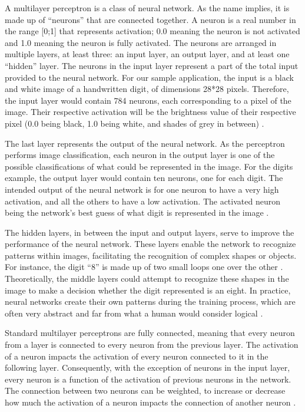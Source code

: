 ﻿\documentclass[12pt,a4paper,notitlepage]{article}
\begin{document}
A multilayer perceptron is a class of neural network. As the name implies, it is made up of “neurons” that are connected together. A neuron is a real number in the range [0;1] that represents activation; 0.0 meaning the neuron is not activated and 1.0 meaning the neuron is fully activated. The neurons are arranged in multiple layers, at least three: an input layer, an output layer, and at least one “hidden” layer. The neurons in the input layer represent a part of the total input provided to the neural network. For our sample application, the input is a black and white image of a handwritten digit, of dimensions 28*28 pixels. Therefore, the input layer would contain 784 neurons, each corresponding to a pixel of the image. Their respective activation will be the brightness value of their respective pixel (0.0 being black, 1.0 being white, and shades of grey in between) \cite{sanderson_but_2017}.

The last layer represents the output of the neural network. As the perceptron performs image classification, each neuron in the output layer is one of the possible classifications of what could be represented in the image. For the digits example, the output layer would contain ten neurons, one for each digit. The intended output of the neural network is for one neuron to have a very high activation, and all the others to have a low activation. The activated neuron being the network's best guess of what digit is represented in the image \cite{sanderson_but_2017}.

The hidden layers, in between the input and output layers, serve to improve the performance of the neural network. These layers enable the network to recognize patterns within images, facilitating the recognition of complex shapes or objects. For instance, the digit “8” is made up of two small loops one over the other \cite{sanderson_but_2017}. Theoretically, the middle layers could attempt to recognize these shapes in the image to make a decision whether the digit represented is an eight. In practice, neural networks create their own patterns during the training process, which are often very abstract and far from what a human would consider logical \cite{sanderson_gradient_2017}.

Standard multilayer perceptrons are fully connected, meaning that every neuron from a layer is connected to every neuron from the previous layer. The activation of a neuron impacts the activation of every neuron connected to it in the following layer. Consequently, with the exception of neurons in the input layer, every neuron is a function of the activation of previous neurons in the network. The connection between two neurons can be weighted, to increase or decrease how much the activation of a neuron impacts the connection of another neuron \cite{sanderson_but_2017}.
\end{document}
